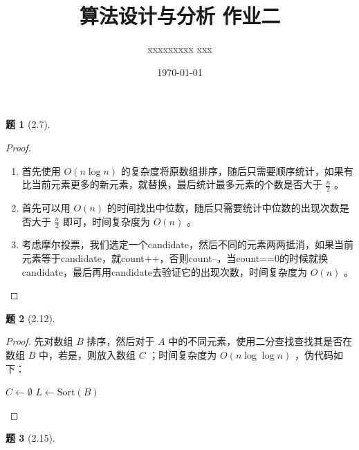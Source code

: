 \documentclass[11pt, a4paper]{article}
\title{算法设计与分析 作业二}
\author{xxxxxxxxx xxx}
\date{\today}
\newtheorem{problem}{题}
\begin{document}
\maketitle

\begin{problem}[2.7]
\end{problem}

\begin{proof}
    \leavevmode
    \begin{enumerate}[label=(\arabic*)]
    \item 首先使用 $O(n \log n)$ 的复杂度将原数组排序，随后只需要顺序统计，如果有比当前元素更多的新元素，就替换，最后统计最多元素的个数是否大于 $\frac{n}{2}$ 。
    \item 首先可以用 $O(n)$ 的时间找出中位数，随后只需要统计中位数的出现次数是否大于 $\frac{n}{2}$ 即可，时间复杂度为 $O(n)$ 。
    \item 考虑摩尔投票，我们选定一个candidate，然后不同的元素两两抵消，如果当前元素等于candidate，就count++，否则count--，当count==0的时候就换candidate，最后再用candidate去验证它的出现次数，时间复杂度为 $O(n)$ 。
    \end{enumerate}
\end{proof}

\begin{problem}[2.12]
\end{problem}

\begin{proof}
    先对数组 $B$ 排序，然后对于 $A$ 中的不同元素，使用二分查找查找其是否在数组 $B$ 中，若是，则放入数组 $C$ ；时间复杂度为 $O(n \log \log n)$ ，伪代码如下：
    
    \begin{algorithm}[H]
    \caption{求数组交集}
    
    $C \leftarrow \emptyset$\;
    $L \leftarrow \text{Sort}(B)$ 
    \end{algorithm}
\end{proof}

\begin{problem}[2.15]
\end{problem}
\end{document}
